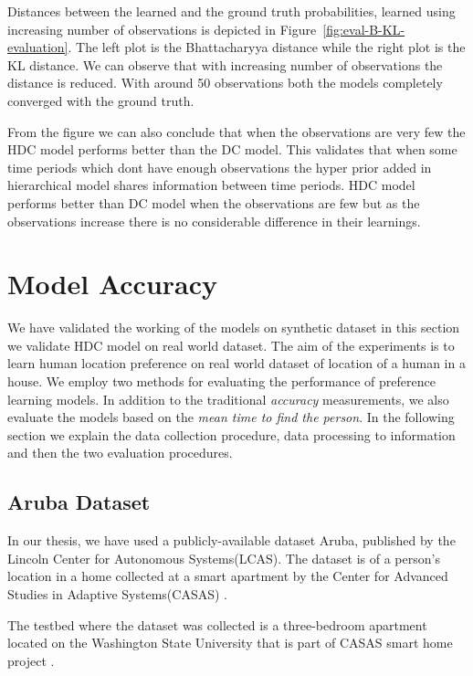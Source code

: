 Distances between the learned and the ground truth probabilities, learned using increasing number of observations is depicted in Figure~\ref{fig:eval-B-KL-evaluation}. The left plot is the Bhattacharyya distance while the right plot is the KL distance. We can observe that with increasing number of observations the distance is reduced. With around 50 observations both the models  completely converged with the ground truth.  

From the figure we can also conclude that when the observations are very few the HDC model performs better than the DC model. This validates that when some time periods which dont have enough observations the hyper prior added in hierarchical model shares information between time periods. HDC model performs better than DC model when the observations are few but as the observations increase there is no considerable difference in their learnings.

\section{Model Accuracy}

We have validated the working of the models on synthetic dataset in this section we validate HDC model on real world dataset. The aim of the experiments is to learn human location preference on real world dataset of location of a human in a house. We employ two methods for evaluating the performance of preference learning models. In addition to the traditional \emph{accuracy} measurements, we also evaluate the models based on the \emph{mean time to find the person}.  In the following section we explain the data collection procedure, data processing to information and then the two evaluation procedures.
 
\subsection{Aruba Dataset}
In our thesis, we have used a  publicly-available  dataset Aruba, published by the Lincoln Center for Autonomous Systems(LCAS). The dataset is of a person's location in a home collected at a smart apartment by the Center for Advanced Studies in Adaptive Systems(CASAS) \cite{aruba} .

The testbed where the dataset was collected is a  three-bedroom apartment located on the Washington State University that is part of CASAS smart home project \cite{aruba}. 


